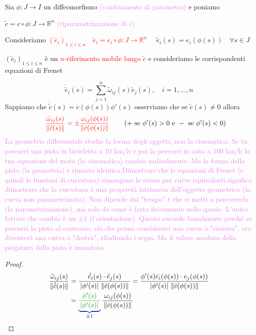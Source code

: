         \begin{osservazione}
        Sia $\phi :J \to I$ un diffeomorfismo \textcolor{violet}{(cambiamento di parametro)} e poniamo 

        $\tilde{c} = c \circ \phi :J \to \mathbb{R}^n$  \textcolor{violet}{(riparametrizzazione di $c$)}

        Consideriamo \textcolor{red}{$\left(\tilde{e}_i\right)_{1 \leq i \leq n} \quad \tilde{e}_i = e_i \circ \phi : J \to \mathbb{R}^n$} $\quad \tilde{e}_i(s) = e_i(\phi(s)) \quad \forall s \in J$

        $\left(\tilde{e}_i\right)_{1 \leq i \leq n}$ è un \textcolor{red}{$n$-riferimento mobile lungo $\tilde{c}$} e consideriamo le corrispondenti equazioni di Frenet

        \[ \dot{\tilde{e}}_i(s) = \sum_{j=1}^{n} \tilde{\omega}_{ij}(s) \tilde{e}_j(s), \quad i = 1, \dots, n \]
        Sappiamo che $\dot{\tilde{c}}(s) = \dot{c}(\phi(s)) \phi'(s)$ osserviamo che se $\dot{\tilde{c}}(s) \neq 0$ allora 
        \[ \qquad \textcolor{red}{\frac{\tilde{\omega}_{ij}(s)}{\lVert\dot{\tilde{c}}(s)\rVert} = \pm \frac{\omega_{ij}(\phi(s))}{\lVert\dot{c}(\phi(s))\rVert}} \qquad \left(+ \text{ se } \phi'(s) > 0 \text{ e } - \text{ se } \phi'(s) < 0 \right) \]
        \textcolor{violet}{La geometria differenziale studia la forma degli oggetti, non la cinematica.
         Se tu percorri una pista in bicicletta a $10$ km/h e poi la percorri in auto a $100$ km/h la tua equazione del moto (la cinematica) cambia radicalmente. 
         Ma la forma della pista (la geometria) è rimasta identica.Dimostrare che le equazioni di Frenet (e quindi le funzioni di curvatura) rimangono le stesse per curve equivalenti significa dimostrare che la curvatura è una proprietà intrinseca dell'oggetto geometrico (la curva non parametrizzata). Non dipende dal "tempo" $t$ che ci metti a percorrerla (la parametrizzazione), ma solo da come è fatta fisicamente nello spazio.  L'unico fattore che cambia è un $\pm 1$ (l'orientazione). Questo succede banalmente perché se percorri la pista al contrario, ciò che prima consideravi una curva a "sinistra", ora diventerà una curva a "destra", ribaltando i segni.
         Ma il valore assoluto della piegatura della pista è immutato. }
        \begin{proof}
        \begin{align*}
        \frac{\tilde{\omega}_{ij}(s)}{\norm{\dot{\tilde{c}}(s)}} &= \frac{ \dot{\tilde{e_i}}(s) \cdot \tilde{e}_j(s) }{ \, \left|\phi ' (s)\right| \, \norm{\dot{c}(\phi(s))} \, } = \frac{ \phi'(s) \dot{e_i}(\phi(s)) \cdot e_j(\phi(s)) }{ \, \left|\phi ' (s)\right| \, \norm{\dot{c}(\phi(s))} \, } \\
        &= \textcolor{blu}{\underbrace{ \textcolor{verde}{\frac{\phi'(s)}{\, \abs {\phi'(s)}  \,}}}_{\pm 1}} \, \frac{\omega_{ij}(\phi(s))}{ \, \norm{\dot{c}(\phi(s))} \,}
        \end{align*}
        \end{proof}
        \end{osservazione}
